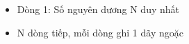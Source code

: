 \begin{itemize}
	\item     Dòng 1: Số nguyên dương N duy nhất   
	\item     N dòng tiếp, mỗi dòng ghi 1 dãy ngoặc   
\end{itemize}